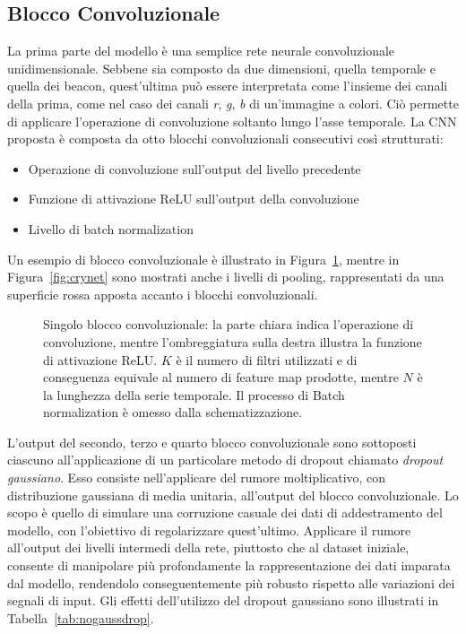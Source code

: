 \subsection{Blocco Convoluzionale}
La prima parte del modello è una semplice rete neurale convoluzionale
unidimensionale. Sebbene sia composto da due dimensioni, quella temporale e
quella dei beacon, quest'ultima può essere interpretata come l'insieme dei
canali della prima, come nel caso dei canali \emph{r}, \emph{g}, \emph{b} di
un'immagine a colori. Ciò permette di applicare l'operazione di convoluzione
soltanto lungo l'asse temporale.
La CNN proposta è composta da otto blocchi convoluzionali consecutivi così
strutturati:
\begin{itemize}
    \item Operazione di convoluzione sull'output del livello precedente
    \item Funzione di attivazione ReLU sull'output della convoluzione
    \item Livello di batch normalization
\end{itemize}
Un esempio di blocco convoluzionale è illustrato in Figura~\ref{fig:cnnblock},
mentre in Figura~\ref{fig:crynet} sono mostrati anche i livelli di pooling,
rappresentati da una superficie rossa apposta accanto i blocchi convoluzionali.
\begin{figure}
  \caption{Singolo blocco convoluzionale: la parte chiara indica l'operazione
    di convoluzione, mentre l'ombreggiatura sulla destra illustra la funzione
    di attivazione ReLU. \(K\) è il numero di filtri utilizzati e di
    conseguenza equivale al numero di feature map prodotte, mentre \(N\) è la
    lunghezza della serie temporale. Il processo di Batch normalization è
    omesso dalla schematizzazione.}%
  \label{fig:cnnblock}%
\end{figure}

L'output del secondo, terzo e quarto blocco convoluzionale sono sottoposti
ciascuno all'applicazione di un particolare metodo di dropout chiamato
\emph{dropout gaussiano}. Esso consiste nell'applicare del rumore
moltiplicativo, con distribuzione gaussiana di media unitaria, all'output del
blocco convoluzionale. Lo scopo è quello di simulare una corruzione casuale dei
dati di addestramento del modello, con l'obiettivo di regolarizzare
quest'ultimo. Applicare il rumore all'output dei livelli intermedi della rete,
piuttosto che al dataset iniziale, consente di manipolare più profondamente la
rappresentazione dei dati imparata dal modello, rendendolo conseguentemente più
robusto rispetto alle variazioni dei segnali di input. Gli effetti
dell'utilizzo del dropout gaussiano sono illustrati in
Tabella~\ref{tab:nogaussdrop}. 

